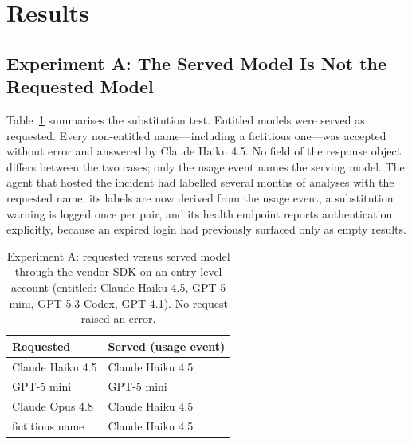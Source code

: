 \section{Results}
\label{sec:results}

\subsection{Experiment A: The Served Model Is Not the Requested Model}
Table~\ref{tab:served} summarises the substitution test. Entitled models were served as requested. Every non-entitled name---including a fictitious one---was accepted without error and answered by Claude Haiku 4.5. No field of the response object differs between the two cases; only the usage event names the serving model. The agent that hosted the incident had labelled several months of analyses with the requested name; its labels are now derived from the usage event, a substitution warning is logged once per pair, and its health endpoint reports authentication explicitly, because an expired login had previously surfaced only as empty results.

\begin{table}[t]
  \caption{Experiment A: requested versus served model through the vendor SDK on an entry-level account (entitled: Claude Haiku 4.5, GPT-5 mini, GPT-5.3 Codex, GPT-4.1). No request raised an error.}
  \label{tab:served}
  \centering
  \footnotesize
  \begin{tabular}{@{}ll@{}}
    \toprule
    Requested & Served (usage event) \\
    \midrule
    Claude Haiku 4.5 & Claude Haiku 4.5 \\
    GPT-5 mini & GPT-5 mini \\
    Claude Opus 4.8 & Claude Haiku 4.5 \\
    fictitious name & Claude Haiku 4.5 \\
    \bottomrule
  \end{tabular}
\end{table}

